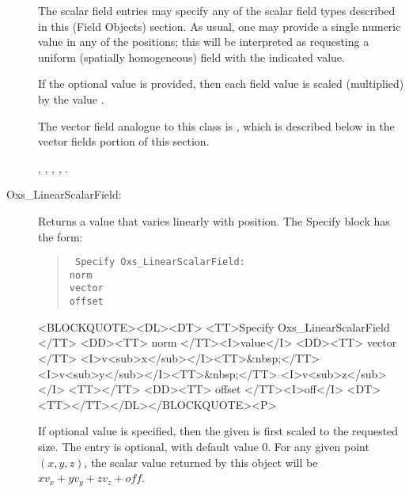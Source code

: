 \begin{description}
   The scalar field entries may specify any of the scalar field types
   described in this (Field Objects) section.  As usual, one may provide
   a single numeric value in any of the 
   positions; this will be interpreted as requesting a uniform (spatially
   homogeneous) field with the indicated value.

   If the optional  value is provided, then each
   field value is scaled (multiplied) by the value .

   The vector field analogue to this class is
   ,
   which is described below in the vector fields portion of this
   section.

   \begin{ExampleMifs}
     , ,
     , , .
   \end{ExampleMifs}

%
\item[Oxs\_LinearScalarField:]
   Returns a value that varies linearly with position.  The Specify
   block has the form:
      \begin{latexonly}
      \begin{quote}\tt
      Specify Oxs\_LinearScalarField: \ocb\\
       \bi norm \\
       \bi vector \ocb{}\ccb\\
       \bi offset \\
      \ccb
      \end{quote}
      \end{latexonly}
      \begin{rawhtml}
      <BLOCKQUOTE><DL><DT>
      <TT>Specify Oxs_LinearScalarField {</TT>
      <DD><TT> norm </TT><I>value</I>
      <DD><TT> vector {</TT>
         <I>v<sub>x</sub></I><TT>&nbsp;</TT>
         <I>v<sub>y</sub></I><TT>&nbsp;</TT>
         <I>v<sub>z</sub></I> <TT>}</TT>
      <DD><TT> offset </TT><I>off</I>
      <DT><TT>}</TT></DL></BLOCKQUOTE><P>
      \end{rawhtml}
   If optional value  is specified, then the given
    is first scaled to the requested size.  The
    entry is optional, with default value 0. For any
   given point $(x,y,z)$, the scalar value returned by this
   object will be $xv_x+yv_y+zv_z + off$.


\end{description}

